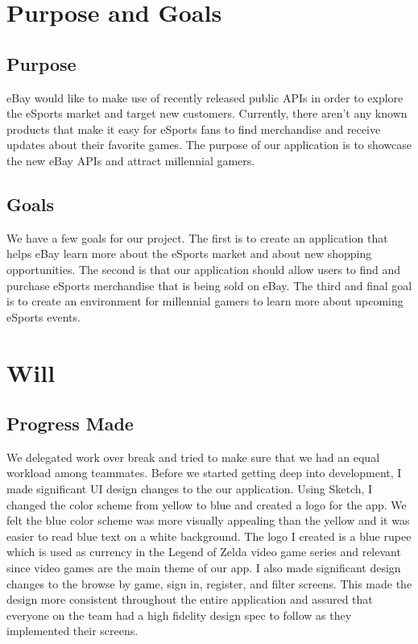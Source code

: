 \documentclass[onecolumn, draftclsnofoot,10pt, compsoc]{IEEEtran}
\begin{document}
\newpage
{}
\tableofcontents
\clearpage

\section{Purpose and Goals}

\subsection{Purpose}
eBay would like to make use of recently released public APIs in order to explore the eSports market and target new customers. 
Currently, there aren’t any known products that make it easy for eSports fans to find merchandise and receive updates about their favorite games. 
The purpose of our application is to showcase the new eBay APIs and attract millennial gamers. 

\subsection{Goals}
We have a few goals for our project. The first is to create an application that helps eBay learn more about the eSports market and about new shopping opportunities. The second is that our application should allow users to find and purchase eSports merchandise that is being sold on eBay. The third and final goal is to create an environment for millennial gamers to learn more about upcoming eSports events.

\section{Will}
\subsection{Progress Made}
We delegated work over break and tried to make sure that we had an equal workload among teammates. Before we started getting deep into development, I made significant UI design changes to the our application. Using Sketch, I changed the color scheme from yellow to blue and created a logo for the app. We felt the blue color scheme was more visually appealing than the yellow and it was easier to read blue text on a white background. The logo I created is a blue rupee which is used as currency in the Legend of Zelda video game series and relevant since video games are the main theme of our app. I also made significant design changes to the browse by game, sign in, register, and filter screens. This made the design more consistent throughout the entire application and assured that everyone on the team had a high fidelity design spec to follow as they implemented their screens. \newline
\end{document}

